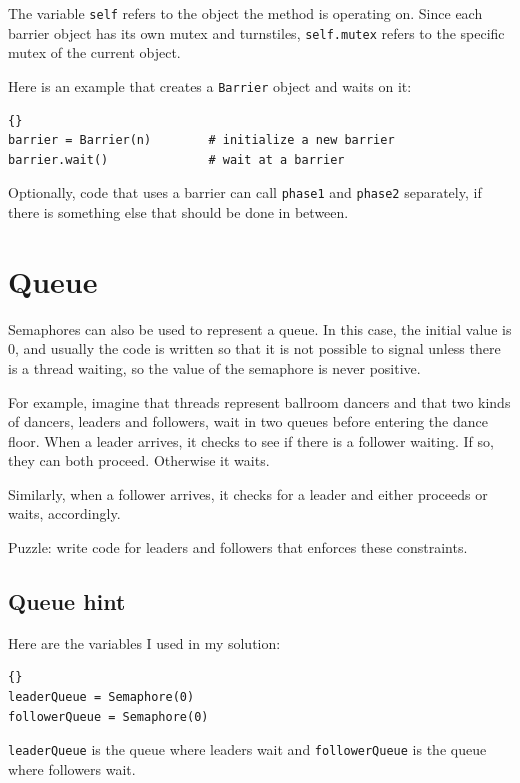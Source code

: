 \documentclass{book}
\begin{document}
The variable {\tt self} refers to the object the method
is operating on.  Since each barrier object has its own
mutex and turnstiles, {\tt self.mutex} refers to the specific
mutex of the current object.

Here is an example that creates a {\tt Barrier}
object and waits on it:

\begin{lstlisting}[title={Barrier interface}]{}
barrier = Barrier(n)        # initialize a new barrier
barrier.wait()              # wait at a barrier
\end{lstlisting}

Optionally, code that uses a barrier can call {\tt phase1} and
    {\tt phase2} separately, if there is something else that
should be done in between.



\section{Queue}
\label{dancers}

Semaphores can also be used to represent a queue.  In this
case, the initial value is 0, and usually the code is written
so that it is not possible
to signal unless there is a thread waiting, so the value of the
semaphore is never positive.

For example, imagine that threads represent ballroom dancers
and that two kinds of dancers, leaders and followers, wait
in two queues before entering the dance floor.  When a leader
arrives, it checks to see if there is a follower waiting.
If so, they can both proceed.  Otherwise it waits.

Similarly, when a follower arrives, it checks for a leader and
either proceeds or waits, accordingly.

Puzzle: write code for leaders and followers that enforces these
constraints.




\subsection {Queue hint}

Here are the variables I used in my solution:

\begin{lstlisting}[title={Queue hint}]{}
leaderQueue = Semaphore(0)
followerQueue = Semaphore(0)
\end{lstlisting}

{\tt leaderQueue} is the queue where leaders wait
and {\tt followerQueue} is the queue where followers wait.
\end{document}
